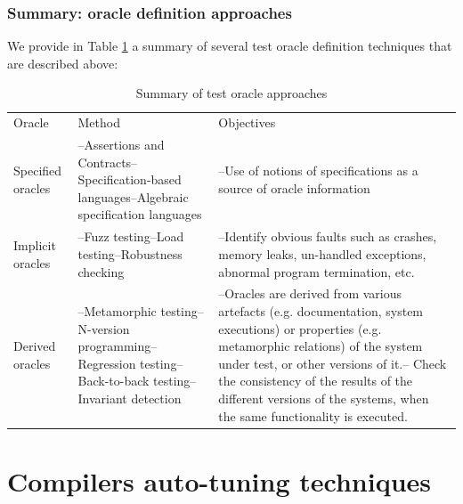 \subsubsection{Summary: oracle definition approaches}
We provide in Table \ref{tab:Summary of test oracle approaches} a summary of several test oracle definition techniques that are described above:

	\begin{table}[H]
		\centering
		\caption{Summary of test oracle approaches}
		\begin{tabular}{| p{} | p{} |p{} |}\hline
			Oracle & Method & Objectives \\	\hhline{|=|=|=|}	
			Specified oracles 
			& --Assertions and Contracts\newline  --Specification-based languages\newline  --Algebraic specification languages  & 
			--Use of notions of specifications as a source of oracle information \\ 
		
			\hline
			Implicit oracles  
			& --Fuzz testing\newline --Load testing\newline --Robustness checking & --Identify obvious faults such as crashes, memory leaks, un-handled exceptions, abnormal program termination, etc. \\
			
			\hline
			Derived oracles 
			& --Metamorphic testing\newline --N-version programming\newline --Regression testing\newline --Back-to-back testing\newline --Invariant detection & --Oracles are derived from various artefacts (e.g. documentation, system executions) or properties (e.g. metamorphic relations) of the system under test, or other versions of it.\newline -- Check the consistency of the results of the different versions of the systems, when the same functionality is executed. \\
			
			\hline
		\end{tabular}
		\label{tab:Summary of test oracle approaches}
	\end{table}

\section{Compilers auto-tuning techniques}
\label{sec:Compilers auto-tuning techniques}

